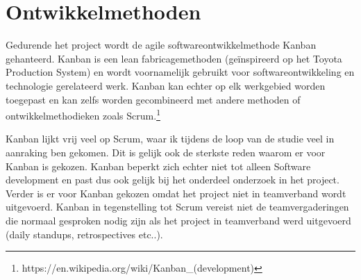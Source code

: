 \chapter{Ontwikkelmethoden}\label{chap:projectmethod}
Gedurende het project wordt de agile softwareontwikkelmethode Kanban gehanteerd. Kanban is een lean fabricagemethoden (geïnspireerd op het Toyota Production System) en wordt voornamelijk gebruikt voor softwareontwikkeling en technologie gerelateerd werk. Kanban kan echter op elk werkgebied worden toegepast en kan zelfs worden gecombineerd met andere methoden of ontwikkelmethodieken zoals Scrum.\footnote{https://en.wikipedia.org/wiki/Kanban\_(development)}\par

Kanban lijkt vrij veel op Scrum, waar ik tijdens de loop van de studie veel in aanraking ben gekomen. Dit is gelijk ook de sterkste reden waarom er voor Kanban is gekozen. Kanban beperkt zich echter niet tot alleen Software development en past dus ook gelijk bij het onderdeel onderzoek in het project. Verder is er voor Kanban gekozen omdat het project niet in teamverband wordt uitgevoerd. Kanban in tegenstelling tot Scrum vereist niet de teamvergaderingen die normaal gesproken nodig zijn als het project in teamverband werd uitgevoerd (daily standups, retrospectives etc..). \par


